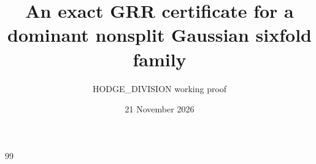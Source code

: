 \documentclass[11pt]{article}
\title{An exact GRR certificate for a dominant nonsplit Gaussian sixfold family}
\author{HODGE\_DIVISION working proof}
\date{21 November 2026}
\begin{document}
\maketitle

\begin{thebibliography}{99}

\end{thebibliography}
\end{document}
